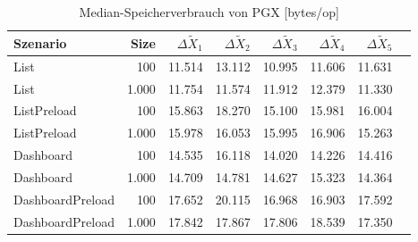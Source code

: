 
\begin{table}[ht]
\setlength{\extrarowheight}{-1pt}
\centering
\caption{Median-Speicherverbrauch von PGX [bytes/op]}
\begin{tabular}{lrrrrrrr}
\toprule
Szenario & Size & ${\Delta \tilde{X}_1}$ & ${\Delta \tilde{X}_2}$ & ${\Delta \tilde{X}_3}$ & ${\Delta \tilde{X}_4}$ & ${\Delta \tilde{X}_5}$ \\
\midrule
	List & 100 & \cellcolor{green!16}  11.514 & \cellcolor{green!18}  13.112 & \cellcolor{green!17}  10.995 & \cellcolor{green!17}  11.606 & \cellcolor{green!15}  11.631 \\
	List & 1.000 & \cellcolor{green!16}  11.754 & \cellcolor{green!18}  11.574 & \cellcolor{green!17}  11.912 & \cellcolor{green!15}  12.379 & \cellcolor{green!16}  11.330 \\
	ListPreload & 100 & \cellcolor{green!10}  15.863 & \cellcolor{green!8}  18.270 & \cellcolor{green!11}  15.100 & \cellcolor{green!10}  15.981 & \cellcolor{green!9}  16.004 \\
	ListPreload & 1.000 & \cellcolor{green!11}  15.978 & \cellcolor{green!10}  16.053 & \cellcolor{green!12}  15.995 & \cellcolor{green!8}  16.906 & \cellcolor{green!11}  15.263 \\
	Dashboard & 100 & \cellcolor{red!9}  14.535 & \cellcolor{red!4}  16.118 & \cellcolor{red!8}  14.020 & \cellcolor{red!9}  14.226 & \cellcolor{red!9}  14.416 \\
	Dashboard & 1.000 & \cellcolor{red!5}  14.709 & \cellcolor{red!6}  14.781 & \cellcolor{red!7}  14.627 & \cellcolor{red!8}  15.323 & \cellcolor{red!7}  14.364 \\
	DashboardPreload & 100 & \cellcolor{red!13}  17.652 & \cellcolor{red!10}  20.115 & \cellcolor{red!12}  16.968 & \cellcolor{red!12}  16.903 & \cellcolor{red!13}  17.592 \\
	DashboardPreload & 1.000 & \cellcolor{red!10}  17.842 & \cellcolor{red!10}  17.867 & \cellcolor{red!12}  17.806 & \cellcolor{red!12}  18.539 & \cellcolor{red!12}  17.350 \\
\bottomrule
\end{tabular}
\label{tab:speicherverbrauch_pgx}
\end{table}
	